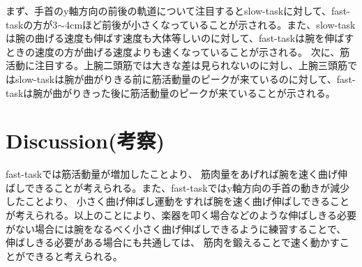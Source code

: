 \documentclass{jsarticle}
\begin{document}
\newpage
まず、手首のy軸方向の前後の軌道について注目するとslow-taskに対して、fast-taskの方が3$\sim$4cmほど前後が小さくなっていることが示される。また、slow-taskは腕の曲げる速度も伸ばす速度も大体等しいのに対して、fast-taskは腕を伸ばすときの速度の方が曲げる速度よりも速くなっていることが示される。
次に、筋活動に注目する。上腕二頭筋では大きな差は見られないのに対し、上腕三頭筋ではslow-taskは腕が曲がりきる前に筋活動量のピークが来ているのに対して、fast-taskは腕が曲がりきった後に筋活動量のピークが来ていることが示される。




\section{Discussion(考察)}
fast-taskでは筋活動量が増加したことより、
筋肉量をあげれば腕を速く曲げ伸ばしできることが考えられる。また、fast-taskではy軸方向の手首の動きが減少したことより、
小さく曲げ伸ばし運動をすれば腕を速く曲げ伸ばしできることが考えられる。以上のことにより、楽器を叩く場合などのような伸ばしきる必要がない場合には腕をなるべく小さく曲げ伸ばしできるように練習することで、
伸ばしきる必要がある場合にも共通しては、
筋肉を鍛えることで速く動かすことができると考えられる。
%
%
\end{document}
